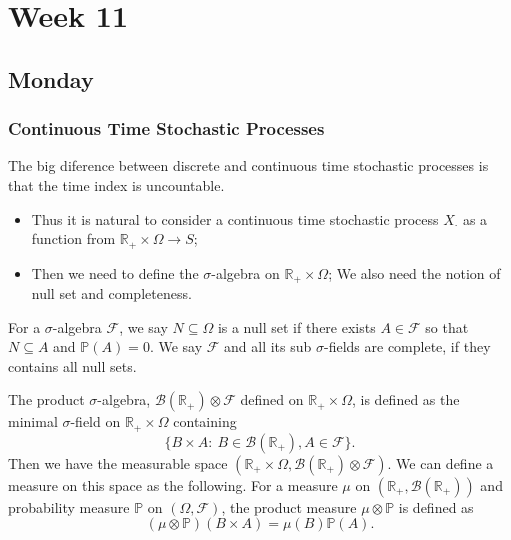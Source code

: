 
\chapter{Week 11}

\section{Monday}

\subsection{Continuous Time Stochastic Processes}

The big diference between discrete and continuous time stochastic processes is that the time index is uncountable.
\begin{itemize}
\item
Thus it is natural to consider a continuous time stochastic process $X_{\cdot}$ as a function from $\mathbb{R}_+\times\Omega\to S$;
\item
Then we need to define the $\sigma$-algebra on $\mathbb{R}_+\times\Omega$;
We also need the notion of null set and completeness.
\end{itemize}

\begin{definition}
For a $\sigma$-algebra $\mathcal{F}$, we say $N\subseteq\Omega$ is a null set if there exists $A\in\mathcal{F}$ so that $N\subseteq A$ and $\mathbb{P}(A)=0$.
We say $\mathcal{F}$ and all its sub $\sigma$-fields are complete, if they contains all null sets.
\end{definition}

\begin{definition}
The product $\sigma$-algebra, $\mathcal{B}(\mathbb{R}_+)\otimes\mathcal{F}$ defined on $\mathbb{R}_+\times\Omega$, is defined as the minimal $\sigma$-field on $\mathbb{R}_+\times\Omega$ containing
\[
\{B\times A:~B\in\mathcal{B}(\mathbb{R}_+), A\in\mathcal{F}\}.
\]
Then we have the measurable space $(\mathbb{R}_+\times\Omega, \mathcal{B}(\mathbb{R}_+)\otimes\mathcal{F})$.
We can define a measure on this space as the following.
For a measure $\mu$ on $(\mathbb{R}_+, \mathcal{B}(\mathbb{R}_+))$ and probability measure $\mathbb{P}$ on $(\Omega,\mathcal{F})$, the product measure $\mu\otimes\mathbb{P}$ is defined as
\[
(\mu\otimes\mathbb{P})(B\times A)=\mu(B)\mathbb{P}(A).
\]
\end{definition}

